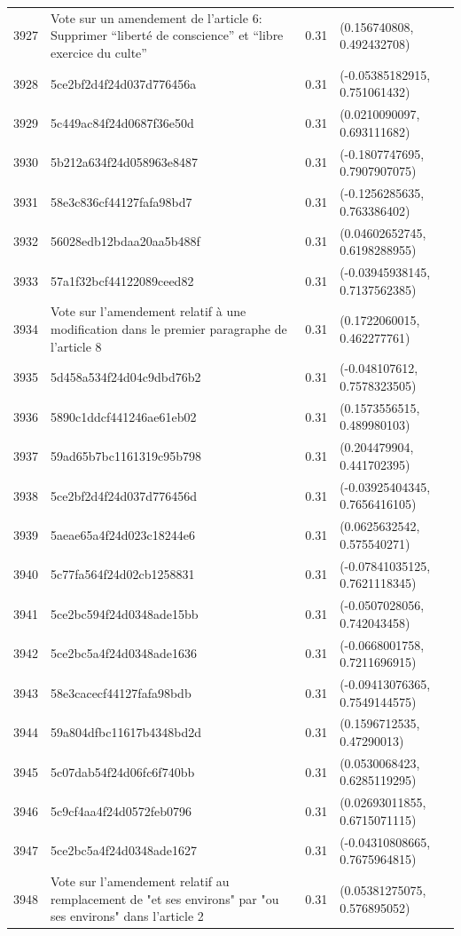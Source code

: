 \begin{table}[ht]
\begin{tabular}{rlrl}
  3927 & Vote sur un amendement de l'article 6: Supprimer “liberté de conscience” et “libre exercice du culte” & 0.31 & (0.156740808, 0.492432708) \\ 
  3928 & 5ce2bf2d4f24d037d776456a & 0.31 & (-0.05385182915, 0.751061432) \\ 
  3929 & 5c449ac84f24d0687f36e50d & 0.31 & (0.0210090097, 0.693111682) \\ 
  3930 & 5b212a634f24d058963e8487 & 0.31 & (-0.1807747695, 0.7907907075) \\ 
  3931 & 58e3c836cf44127fafa98bd7 & 0.31 & (-0.1256285635, 0.763386402) \\ 
  3932 & 56028edb12bdaa20aa5b488f & 0.31 & (0.04602652745, 0.6198288955) \\ 
  3933 & 57a1f32bcf44122089ceed82 & 0.31 & (-0.03945938145, 0.7137562385) \\ 
  3934 & Vote sur l'amendement relatif à une modification dans le premier paragraphe de l'article 8 & 0.31 & (0.1722060015, 0.462277761) \\ 
  3935 & 5d458a534f24d04c9dbd76b2 & 0.31 & (-0.048107612, 0.7578323505) \\ 
  3936 & 5890c1ddcf441246ae61eb02 & 0.31 & (0.1573556515, 0.489980103) \\ 
  3937 & 59ad65b7bc1161319c95b798 & 0.31 & (0.204479904, 0.441702395) \\ 
  3938 & 5ce2bf2d4f24d037d776456d & 0.31 & (-0.03925404345, 0.7656416105) \\ 
  3939 & 5aeae65a4f24d023c18244e6 & 0.31 & (0.0625632542, 0.575540271) \\ 
  3940 & 5c77fa564f24d02cb1258831 & 0.31 & (-0.07841035125, 0.7621118345) \\ 
  3941 & 5ce2bc594f24d0348ade15bb & 0.31 & (-0.0507028056, 0.742043458) \\ 
  3942 & 5ce2bc5a4f24d0348ade1636 & 0.31 & (-0.0668001758, 0.7211696915) \\ 
  3943 & 58e3cacecf44127fafa98bdb & 0.31 & (-0.09413076365, 0.7549144575) \\ 
  3944 & 59a804dfbc11617b4348bd2d & 0.31 & (0.1596712535, 0.47290013) \\ 
  3945 & 5c07dab54f24d06fc6f740bb & 0.31 & (0.0530068423, 0.6285119295) \\ 
  3946 & 5c9cf4aa4f24d0572feb0796 & 0.31 & (0.02693011855, 0.6715071115) \\ 
  3947 & 5ce2bc5a4f24d0348ade1627 & 0.31 & (-0.04310808665, 0.7675964815) \\ 
  3948 & Vote sur l'amendement relatif au remplacement de "et ses environs" par "ou ses environs" dans l'article 2 & 0.31 & (0.05381275075, 0.576895052) \\ 

\end{tabular}
\end{table}
